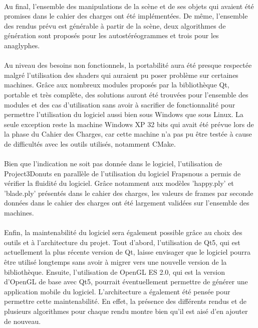 \paragraph{}
Au final, l'ensemble des manipulations de la scène et de ses objets qui avaient été promises dans le cahier des charges ont été implémentées. De même, l'ensemble des rendus prévu est générable à partir de la scène, deux algorithmes de génération sont proposés pour les autostéréogrammes et trois pour les anaglyphes.

\paragraph{}
Au niveau des besoins non fonctionnels, la portabilité aura été presque respectée malgré l'utilisation des shaders qui auraient pu poser problème sur certaines machines. Grâce aux nombreux modules proposés par la bibliothèque Qt, portable et très complète, des solutions auront été trouvées pour l'ensemble des modules et des cas d'utilisation sans avoir à sacrifier de fonctionnalité pour permettre l'utilisation du logiciel aussi bien sous Windows que sous Linux. La seule exception reste la machine Windows XP 32 bits qui avait été prévue lors de la phase du Cahier des Charges, car cette machine n'a pas pu être testée à cause de difficultés avec les outils utilisés, notamment CMake.

\paragraph{}
Bien que l'indication ne soit pas donnée dans le logiciel, l'utilisation de Project3Donuts en parallèle de l'utilisation du logiciel Fraps\footnotemark nous a permis de vérifier la fluidité du logiciel. Grâce notamment aux modèles 'happy.ply' et 'blade.ply' présentés dans le cahier des charges, les valeurs de frames par seconde données dans le cahier des charges ont été largement validées sur l'ensemble des machines.
\paragraph{}
Enfin, la maintenabilité du logiciel sera également possible grâce au choix des outils et à l'architecture du projet. 
Tout d'abord, l'utilisation de Qt5, qui est actuellement la plus récente version de Qt, laisse envisager que le logiciel pourra être utilisé longtemps sans avoir à migrer vers une nouvelle version de la bibliothèque. Ensuite, l'utilisation de OpenGL ES 2.0, qui est la version d'OpenGL de base avec Qt5, pourrait éventuellement permettre de générer une application mobile du logiciel. 
L'architecture a également été pensée pour permettre cette maintenabilité. En effet, la présence des différents rendus et de plusieurs algorithmes pour chaque rendu montre bien qu'il est aisé d'en ajouter de nouveau.

